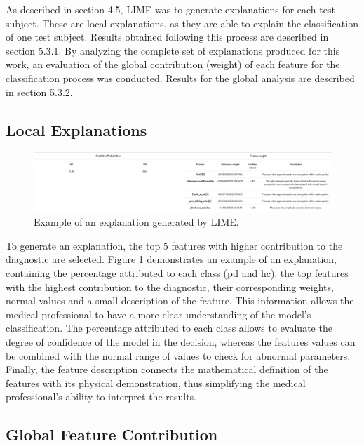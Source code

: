 As described in section 4.5, LIME was to generate explanations for each test subject. These are local explanations, as they are able to explain the classification of one test subject. Results obtained following this process are described in section 5.3.1. By analyzing the complete set of explanations produced for this work, an evaluation of the global contribution (weight) of each feature for the classification process was conducted. Results for the global analysis are described in section 5.3.2.

\subsection{Local Explanations}

\begin{figure}[t]
	\begin{center}
		\includegraphics[clip=true, width=\textwidth]{figs/example_explanation.png}
	\end{center}
	\caption{Example of an explanation generated by LIME.}
	\label{explanation}
\end{figure}

To generate an explanation, the top 5 features with higher contribution to the diagnostic are selected. Figure \ref{explanation} demonstrates an example of an explanation, containing the percentage attributed to each class (\gls{pd} and \gls{hc}), the top features with the highest contribution to the diagnostic, their corresponding weights, normal values and a small description of the feature. This information allows the medical professional to have a more clear understanding of the model's classification. The percentage attributed to each class allows to evaluate the degree of confidence of the model in the decision, whereas the features values can be combined with the normal range of values to check for abnormal parameters. Finally, the feature description connects the mathematical definition of the features with its physical demonstration, thus simplifying the medical professional's ability to interpret the results. 

\subsection{Global Feature Contribution}

